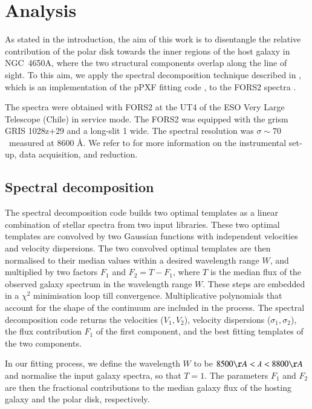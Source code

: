 \documentclass{aa}
\begin{document}

\section{Analysis}
\label{sec:analysis}

As stated in the introduction, the aim of this work is to disentangle
the relative contribution of the polar disk towards the inner regions
of the host galaxy in NGC~4650A, where the two structural components
overlap along the line of sight. To this aim, we apply the spectral
decomposition technique described in \citet{Coccato+11, Coccato+13},
which is an implementation of the pPXF fitting code
\citep{Cappellari+04}, to the FORS2 spectra \citep{Iodice+06}.

The spectra were obtained with FORS2 at the UT4 of the ESO Very Large
Telescope (Chile) in service mode. The FORS2 was equipped with the grism
GRIS 1028z+29 and a long-slit 1 wide. The spectral resolution
was $\sigma \sim 70$ \kms\ measured at 8600 \AA. We refer to
\citet{Iodice+06} for more information on the instrumental set-up,
data acquisition, and reduction.

\subsection{Spectral decomposition}

The spectral decomposition code builds two optimal templates as a
linear combination of stellar spectra from two input libraries. These
two optimal templates are convolved by two Gaussian functions with
independent velocities and velocity dispersions. The two convolved
optimal templates are then normalised to their median values within a
desired wavelength range $W$, and multiplied by two factors $F_1$ and
$F_2=T-F_1$, where $T$ is the median flux of the observed galaxy
spectrum in the wavelength range $W$.  These steps are embedded in a
$\chi^2$ minimisation loop till convergence. Multiplicative
polynomials that account for the shape of the continuum are included
in the process.
The spectral decomposition code returns the velocities ($V_1, V_2$),
velocity dispersions ($\sigma_1, \sigma_2$), the flux contribution
$F_1$ of the first component, and the best fitting templates of the
two components.

In our fitting process, we define the wavelength $W$ to be $8500 \AA <
\lambda < 8800 \AA$ and normalise the input galaxy spectra, so that
$T=1$. The parameters $F_1$ and $F_2$ are then the fractional
contributions to the median galaxy flux of the hosting galaxy and the
polar disk, respectively.
\end{document}

